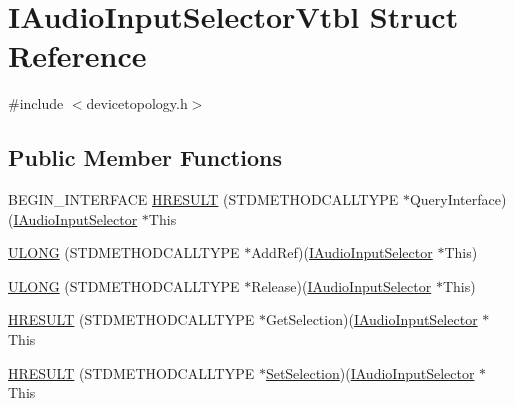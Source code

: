 \hypertarget{struct_i_audio_input_selector_vtbl}{}\section{I\+Audio\+Input\+Selector\+Vtbl Struct Reference}
\label{struct_i_audio_input_selector_vtbl}


{\ttfamily \#include $<$devicetopology.\+h$>$}

\subsection*{Public Member Functions}
\begin{DoxyCompactItemize}
\item 
B\+E\+G\+I\+N\+\_\+\+I\+N\+T\+E\+R\+F\+A\+CE \hyperlink{struct_i_audio_input_selector_vtbl_ae6a901b8ec0852ba52369a7f080112ee}{H\+R\+E\+S\+U\+LT} (S\+T\+D\+M\+E\+T\+H\+O\+D\+C\+A\+L\+L\+T\+Y\+PE $\ast$Query\+Interface)(\hyperlink{devicetopology_8h_a03acf1b6f62999a3eb43b007e2cb2b7c}{I\+Audio\+Input\+Selector} $\ast$This
\item 
\hyperlink{struct_i_audio_input_selector_vtbl_a23c02ee75d41f4f9f4be5bb569aff8e4}{U\+L\+O\+NG} (S\+T\+D\+M\+E\+T\+H\+O\+D\+C\+A\+L\+L\+T\+Y\+PE $\ast$Add\+Ref)(\hyperlink{devicetopology_8h_a03acf1b6f62999a3eb43b007e2cb2b7c}{I\+Audio\+Input\+Selector} $\ast$This)
\item 
\hyperlink{struct_i_audio_input_selector_vtbl_a2e237a251e35c08429e02dec58cce5b7}{U\+L\+O\+NG} (S\+T\+D\+M\+E\+T\+H\+O\+D\+C\+A\+L\+L\+T\+Y\+PE $\ast$Release)(\hyperlink{devicetopology_8h_a03acf1b6f62999a3eb43b007e2cb2b7c}{I\+Audio\+Input\+Selector} $\ast$This)
\item 
\hyperlink{struct_i_audio_input_selector_vtbl_a5d6a27bd74fdb9f38167874f9f7647d6}{H\+R\+E\+S\+U\+LT} (S\+T\+D\+M\+E\+T\+H\+O\+D\+C\+A\+L\+L\+T\+Y\+PE $\ast$Get\+Selection)(\hyperlink{devicetopology_8h_a03acf1b6f62999a3eb43b007e2cb2b7c}{I\+Audio\+Input\+Selector} $\ast$This
\item 
\hyperlink{struct_i_audio_input_selector_vtbl_a23bd43c47c8656fcaf6abc8577dc914d}{H\+R\+E\+S\+U\+LT} (S\+T\+D\+M\+E\+T\+H\+O\+D\+C\+A\+L\+L\+T\+Y\+PE $\ast$\hyperlink{_mac_command_win_8h_aae86b47ff210244d75f17a6e58233a31}{Set\+Selection})(\hyperlink{devicetopology_8h_a03acf1b6f62999a3eb43b007e2cb2b7c}{I\+Audio\+Input\+Selector} $\ast$This
\end{DoxyCompactItemize}
